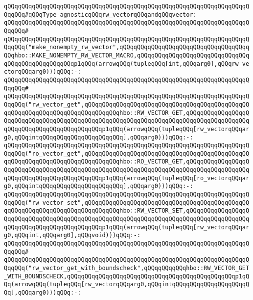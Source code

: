 \newline
\verb|qQQqqQQqqQQqqQQqqQQqqQQqqQQqqQQqqQQqqQQqqQQqqQQqqQQqqQQqqQQqqQQqqQQqqQQqqQQq#qQQqType-agnosticqQQqrw_vectorqQQqandqQQqvector:|\newline
\verb|qQQqqQQqqQQqqQQqqQQqqQQqqQQqqQQqqQQqqQQqqQQqqQQqqQQqqQQqqQQqqQQqqQQqqQQqqQQq#|\newline
\verb|qQQqqQQqqQQqqQQqqQQqqQQqqQQqqQQqqQQqqQQqqQQqqQQqqQQqqQQqqQQqqQQqqQQqqQQqqQQq("make_nonempty_rw_vector",qQQqqQQqqQQqqQQqqQQqqQQqqQQqqQQqqQQqqQQqhbo::MAKE_NONEMPTY_RW_VECTOR_MACRO,qQQqqQQqqQQqqQQqqQQqqQQqqQQqqQQqqQQqqQQqqQQqqQQqqQQqp1qQQq(arrowqQQq(tupleqQQq[int,qQQqarg0],qQQqrw_vectorqQQqarg0)))qQQq:-:|\newline
\verb|qQQqqQQqqQQqqQQqqQQqqQQqqQQqqQQqqQQqqQQqqQQqqQQqqQQqqQQqqQQqqQQqqQQqqQQqqQQq#|\newline
\verb|qQQqqQQqqQQqqQQqqQQqqQQqqQQqqQQqqQQqqQQqqQQqqQQqqQQqqQQqqQQqqQQqqQQqqQQqqQQq("rw_vector_get",qQQqqQQqqQQqqQQqqQQqqQQqqQQqqQQqqQQqqQQqqQQqqQQqqQQqqQQqqQQqqQQqqQQqqQQqqQQqqQQqhbo::RW_VECTOR_GET,qQQqqQQqqQQqqQQqqQQqqQQqqQQqqQQqqQQqqQQqqQQqqQQqqQQqqQQqqQQqqQQqqQQqqQQqqQQqqQQqqQQqqQQqqQQqqQQqqQQqqQQqqQQqqQQqqQQqp1qQQq(arrowqQQq(tupleqQQq[rw_vectorqQQqarg0,qQQqintqQQqqQQqqQQqqQQqqQQqqQQq],qQQqarg0)))qQQq:-:|\newline
\verb|qQQqqQQqqQQqqQQqqQQqqQQqqQQqqQQqqQQqqQQqqQQqqQQqqQQqqQQqqQQqqQQqqQQqqQQqqQQq("ro_vector_get",qQQqqQQqqQQqqQQqqQQqqQQqqQQqqQQqqQQqqQQqqQQqqQQqqQQqqQQqqQQqqQQqqQQqqQQqqQQqqQQqhbo::RO_VECTOR_GET,qQQqqQQqqQQqqQQqqQQqqQQqqQQqqQQqqQQqqQQqqQQqqQQqqQQqqQQqqQQqqQQqqQQqqQQqqQQqqQQqqQQqqQQqqQQqqQQqqQQqqQQqqQQqqQQqqQQqp1qQQq(arrowqQQq(tupleqQQq[ro_vectorqQQqarg0,qQQqintqQQqqQQqqQQqqQQqqQQqqQQq],qQQqarg0)))qQQq:-:|\newline
\verb|qQQqqQQqqQQqqQQqqQQqqQQqqQQqqQQqqQQqqQQqqQQqqQQqqQQqqQQqqQQqqQQqqQQqqQQqqQQq("rw_vector_set",qQQqqQQqqQQqqQQqqQQqqQQqqQQqqQQqqQQqqQQqqQQqqQQqqQQqqQQqqQQqqQQqqQQqqQQqqQQqqQQqhbo::RW_VECTOR_SET,qQQqqQQqqQQqqQQqqQQqqQQqqQQqqQQqqQQqqQQqqQQqqQQqqQQqqQQqqQQqqQQqqQQqqQQqqQQqqQQqqQQqqQQqqQQqqQQqqQQqqQQqqQQqqQQqqQQqp1qQQq(arrowqQQq(tupleqQQq[rw_vectorqQQqarg0,qQQqint,qQQqarg0],qQQqvoid)))qQQq:-:|\newline
\verb|qQQqqQQqqQQqqQQqqQQqqQQqqQQqqQQqqQQqqQQqqQQqqQQqqQQqqQQqqQQqqQQqqQQqqQQqqQQq#|\newline
\verb|qQQqqQQqqQQqqQQqqQQqqQQqqQQqqQQqqQQqqQQqqQQqqQQqqQQqqQQqqQQqqQQqqQQqqQQqqQQq("rw_vector_get_with_boundscheck",qQQqqQQqqQQqhbo::RW_VECTOR_GET_WITH_BOUNDSCHECK,qQQqqQQqqQQqqQQqqQQqqQQqqQQqqQQqqQQqqQQqqQQqqQQqp1qQQq(arrowqQQq(tupleqQQq[rw_vectorqQQqarg0,qQQqintqQQqqQQqqQQqqQQqqQQqqQQq],qQQqarg0)))qQQq:-:|\newline
